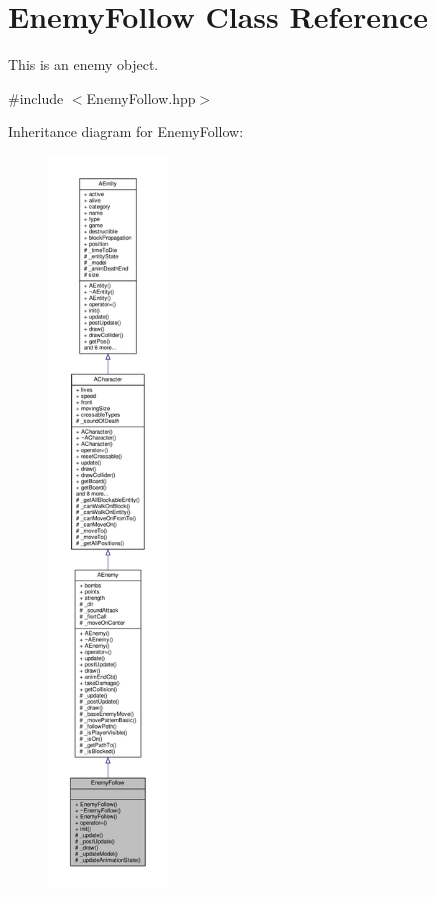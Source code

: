 \hypertarget{class_enemy_follow}{}\section{Enemy\+Follow Class Reference}
\label{class_enemy_follow}


This is an enemy object.  




{\ttfamily \#include $<$Enemy\+Follow.\+hpp$>$}



Inheritance diagram for Enemy\+Follow\+:
\nopagebreak
\begin{figure}[H]
\begin{center}
\leavevmode
\includegraphics[height=550pt]{class_enemy_follow__inherit__graph}
\end{center}
\end{figure}



